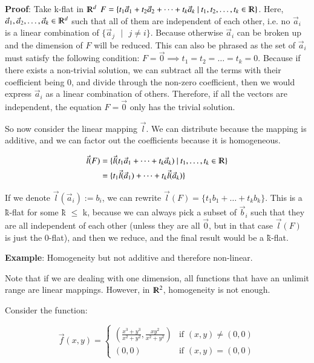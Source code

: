 \documentclass [12 pt, twoside] {book}
\newcommand\+{\text{ }}
\begin{document}
\textbf{Proof}: Take k-flat in $\varmathbb{R}^d$ $F = \{t_1\vec{a}_1 +
t_2\vec{a}_2 + \dots + t_k\vec{a}_k \+|\+ t_1, t_2, \dots, t_k \in
\varmathbb{R}\}$. Here, $\vec{a}_1, \vec{a}_2, \dots, \vec{a}_k \in
\varmathbb{R}^d$ such that all of them are independent of each other, i.e. no
$\vec{a}_i$ is a linear combination of $\{\vec{a}_j \+|\+ j \neq i\}$. Because
otherwise $\vec{a}_i$ can be broken up and the dimension of $F$ will be reduced.
This can also be phrased as the set of $\vec{a}_i$ must satisfy the following condition:
$F = \vec{0} \implies t_1 = t_2 = \dots = t_k = 0$. Because if there exists a
non-trivial solution, we can subtract all the terms with their coefficient being
0, and divide through the non-zero coefficient, then we would express
$\vec{a}_i$ as a linear combination of others. Therefore, if all the vectors are
independent, the equation $F = \vec{0}$ only has the trivial solution.

So now consider the linear mapping $\vec{l}$. We can distribute because the
mapping is additive, and we can factor out the coefficients because it is
homogeneous.

\begin{align*}
    \vec{l}(F) &= \{\vec{l}(t_1\vec{a}_1 + \dots + t_k\vec{a}_k) \+|\+ t_1, \dots, t_k \in \varmathbb{R}\}\\
               &= \{t_1 \vec{l}(\vec{a}_1) + \dots + t_k \vec{l}(\vec{a}_k)\}
\end{align*}

If we denote $\vec{l}(\vec{a}_i) := b_i$, we can rewrite $\vec{l}(F) = \{t_1
b_1 + \dots + t_k b_k\}$. This is a \~{k}-flat for some \~{k} $\leq$ k, because
we can always pick a subset of $\vec{b}_i$ such that they are all independent of
each other (unless they are all $\vec{0}$, but in that case $\vec{l}(F)$ is just
the 0-flat), and then we reduce, and the final result would be a \~{k}-flat.
\vspace{0.2cm}

\textbf{Example}: Homogeneity but not additive and therefore non-linear.

Note that if we are dealing with one dimension, all functions that have an
unlimit range are linear mappings. However, in $\varmathbb{R}^2$, homogeneity is
not enough.

Consider the function:

\[
    \vec{f}(x, y) =
        \begin{cases}
            (\frac{x^3 + y^3}{x^2 + y^2}, \frac{xy^2}{x^2+y^2}) & \mbox{if } (x,
            y) \neq (0, 0)\\
            (0, 0) & \mbox{if } (x, y) = (0,0)
        \end{cases}
\]
\end{document}
